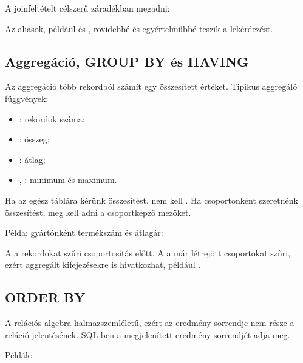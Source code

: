 A joinfeltételt célszerű  záradékban megadni:

\begin{center}
\end{center}

Az aliasok, például  és , rövidebbé és egyértelműbbé teszik a lekérdezést.

\subsection{Aggregáció, GROUP BY és HAVING}

Az aggregáció több rekordból számít egy összesített értéket. Tipikus aggregáló függvények:

\begin{itemize}
  \item {}: rekordok száma;
  \item {}: összeg;
  \item {}: átlag;
  \item {}, : minimum és maximum.
\end{itemize}

Ha az egész táblára kérünk összesítést, nem kell . Ha csoportonként szeretnénk összesítést, meg kell adni a csoportképző mezőket.

Példa: gyártónként termékszám és átlagár:

\begin{center}
\end{center}

A  a rekordokat szűri csoportosítás előtt. A  a már létrejött csoportokat szűri, ezért aggregált kifejezésekre is hivatkozhat, például .


\subsection{ORDER BY}

A relációs algebra halmazszemléletű, ezért az eredmény sorrendje nem része a reláció jelentésének. SQL-ben a megjelenített eredmény sorrendjét  adja meg.

Példák:

